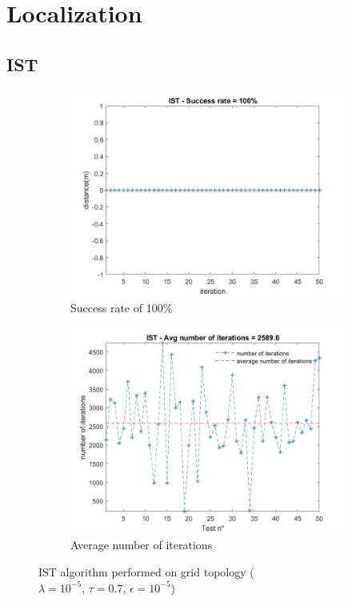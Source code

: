 \section{Localization}

\subsection{IST}

\begin{figure}[H]
    \begin{subfigure}{0.45\textwidth}
        \centering
        \includegraphics[width=\textwidth]{img/IST_distance_grid.jpg}
        \caption{Success rate of 100\%}
    \end{subfigure}
    \hfill
    \begin{subfigure}{0.45\textwidth}
        \centering
        \includegraphics[width=\textwidth]{img/IST_num_iterations_grid.jpg}
        \caption{Average number of iterations}
    \end{subfigure}
    \caption{IST algorithm performed on grid topology ($\lambda=10^{-5},\,\tau=0.7,\,\epsilon=10^{-5}$)}
\end{figure}


